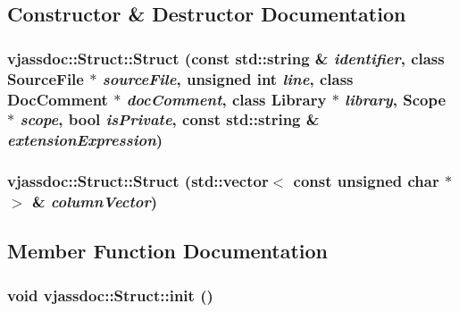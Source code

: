 \subsection{Constructor \& Destructor Documentation}
\hypertarget{classvjassdoc_1_1Struct_3c985875cff8b6b41f1193aa0bdd124f}{
\subsubsection{\setlength{\rightskip}{0pt plus 5cm}vjassdoc::Struct::Struct (const std::string \& {\em identifier}, class {\bf SourceFile} $\ast$ {\em sourceFile}, unsigned int {\em line}, class {\bf DocComment} $\ast$ {\em docComment}, class {\bf Library} $\ast$ {\em library}, {\bf Scope} $\ast$ {\em scope}, bool {\em isPrivate}, const std::string \& {\em extensionExpression})}}
\label{classvjassdoc_1_1Struct_3c985875cff8b6b41f1193aa0bdd124f}


\hypertarget{classvjassdoc_1_1Struct_577a9bb757bf7775389eb8e6e59dee1a}{
\subsubsection{\setlength{\rightskip}{0pt plus 5cm}vjassdoc::Struct::Struct (std::vector$<$ const unsigned char $\ast$ $>$ \& {\em columnVector})}}
\label{classvjassdoc_1_1Struct_577a9bb757bf7775389eb8e6e59dee1a}




\subsection{Member Function Documentation}
\hypertarget{classvjassdoc_1_1Struct_39dc86da31e526f3a6eb3b6e442156bb}{
\subsubsection{\setlength{\rightskip}{0pt plus 5cm}void vjassdoc::Struct::init ()}}
\label{classvjassdoc_1_1Struct_39dc86da31e526f3a6eb3b6e442156bb}




